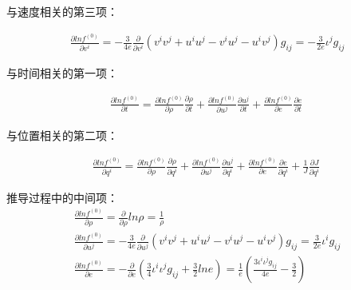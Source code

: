\documentclass[LBMDerivation.tex]{subfiles}
\begin{document}
与速度相关的第三项：

\begin{equation}
  \begin{gathered}
    \frac{\partial ln f^{(0)}}{\partial v^i} =
    -\frac{3}{4e} \frac{\partial}{\partial v^i}(v^iv^j+u^iu^j-v^iu^j-u^iv^j)g_{ij}=-\frac{3}{2e}\iota^j g_{ij}
  \end{gathered}
\end{equation}

与时间相关的第一项：

\begin{equation}
  \begin{gathered}
    \frac{\partial ln f^{(0)}}{\partial t} =
    \frac{\partial ln f^{(0)}}{\partial \rho} \frac{\partial \rho}{\partial t} +     \frac{\partial ln f^{(0)}}{\partial u^j} \frac{\partial u^j}{\partial t} +     \frac{\partial ln f^{(0)}}{\partial e} \frac{\partial e}{\partial t}
  \end{gathered}
  \label{EQUATION::推导lnt} ~
\end{equation}



与位置相关的第二项：

\begin{equation}
  \begin{gathered}
    \frac{\partial ln f^{(0)}}{\partial q^i} =
    \frac{\partial ln f^{(0)}}{\partial \rho} \frac{\partial \rho}{\partial q^i} +     \frac{\partial ln f^{(0)}}{\partial u^j} \frac{\partial u^j}{\partial q^i} +     \frac{\partial ln f^{(0)}}{\partial e} \frac{\partial e}{\partial q^i} + \frac{1}{J}\frac{\partial J}{\partial q^i}
  \end{gathered}
  \label{EQUATION::推导lnxi} ~
\end{equation}



推导过程中的中间项：
\begin{equation}
  \begin{gathered}
    \frac{\partial ln f^{(0)}}{\partial \rho}=\frac{\partial}{\partial \rho}ln \rho=\frac{1}{\rho} \\
    \frac{\partial ln f^{(0)}}{\partial u^j}=-\frac{3}{4e} \frac{\partial}{\partial u^j}(v^iv^j+u^iu^j-v^iu^j-u^iv^j)g_{ij}=\frac{3}{2e}\iota^i g_{ij} \\
    \frac{\partial ln f^{(0)}}{\partial e}=-\frac{\partial}{\partial e}(\frac{3}{4}{\iota^i\iota^jg_{ij}}+\frac{3}{2} ln e )=\frac{1}{e}(\frac{3 {\iota^i\iota^jg_{ij}}}{4e}-\frac{3}{2})
  \end{gathered}
\end{equation}
\end{document}
